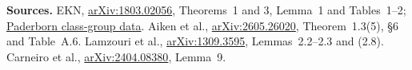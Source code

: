 \documentclass[11pt,letterpaper]{article}
\begin{document}
\textbf{Sources.} EKN, \href{https://arxiv.org/abs/1803.02056}{arXiv:1803.02056},
Theorems~1 and 3, Lemma~1 and Tables~1--2; \href{https://math.uni-paderborn.de/en/ag/ca/research/exponent/exponent0}{Paderborn class-group data}.
Aiken et al., \href{https://arxiv.org/abs/2605.26020}{arXiv:2605.26020},
Theorem~1.3(5), \S6 and Table~A.6. Lamzouri et al., \href{https://arxiv.org/abs/1309.3595}{arXiv:1309.3595},
Lemmas~2.2--2.3 and (2.8). Carneiro et al.,
\href{https://arxiv.org/abs/2404.08380}{arXiv:2404.08380}, Lemma~9.
\end{document}
